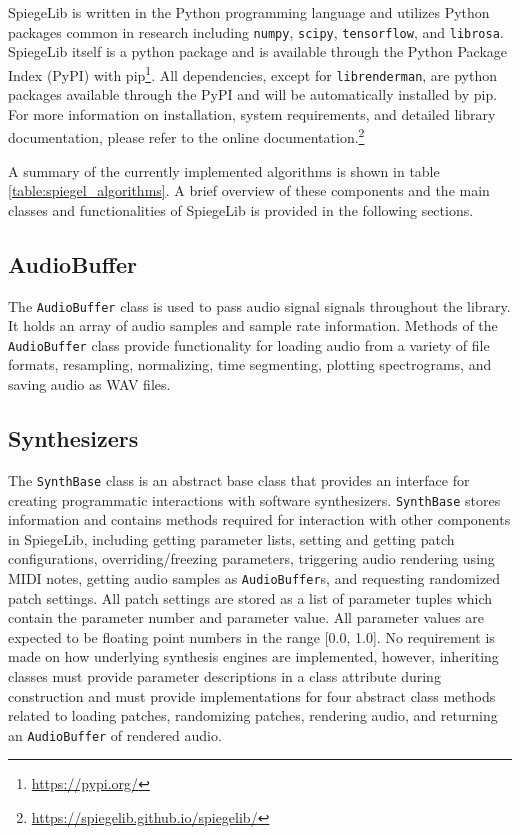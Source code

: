 SpiegeLib is written in the Python programming language and utilizes Python packages common in research including \texttt{numpy}, \texttt{scipy}, \texttt{tensorflow}, and \texttt{librosa}. SpiegeLib itself is a python package and is available through the Python Package Index (PyPI) with pip\footnote{\url{https://pypi.org/}}. All dependencies, except for \texttt{librenderman}, are python packages available through the PyPI and will be automatically installed by pip. For more information on installation, system requirements, and detailed library documentation, please refer to the  online documentation.\footnote{\url{https://spiegelib.github.io/spiegelib/}}

A summary of the currently implemented algorithms is shown in table \ref{table:spiegel_algorithms}. A brief overview of these components and the main classes and functionalities of SpiegeLib is provided in the following sections.
 

 
\subsection{AudioBuffer}
The \texttt{AudioBuffer} class is used to pass audio signal signals throughout the library. It holds an array of audio samples and sample rate information. Methods of the \texttt{AudioBuffer} class provide functionality for loading audio from a variety of file formats, resampling, normalizing, time segmenting, plotting spectrograms, and saving audio as WAV files.

\subsection{Synthesizers}
The \texttt{SynthBase} class is an abstract base class that provides an interface for creating programmatic interactions with software synthesizers. \texttt{SynthBase} stores information and contains methods required for interaction with other components in SpiegeLib, including getting parameter lists, setting and getting patch configurations, overriding/freezing parameters, triggering audio rendering using MIDI notes, getting audio samples as \texttt{AudioBuffer}s, and requesting randomized patch settings. All patch settings are stored as a list of parameter tuples which contain the parameter number and parameter value. All parameter values are expected to be floating point numbers in the range [0.0, 1.0]. No requirement is made on how underlying synthesis engines are implemented, however, inheriting classes must provide parameter descriptions in a class attribute during construction and must provide implementations for four abstract class methods related to loading patches, randomizing patches, rendering audio, and returning an \texttt{AudioBuffer} of rendered audio.

